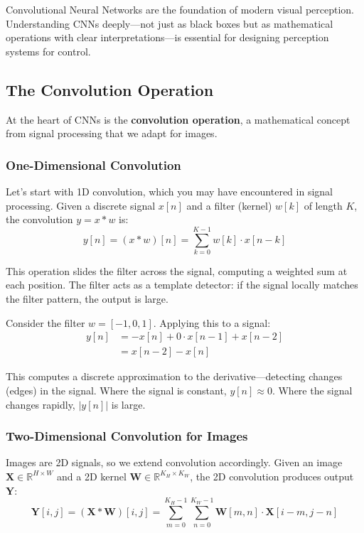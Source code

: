 Convolutional Neural Networks are the foundation of modern visual perception. Understanding CNNs deeply---not just as black boxes but as mathematical operations with clear interpretations---is essential for designing perception systems for control.

\subsection{The Convolution Operation}

At the heart of CNNs is the \textbf{convolution operation}, a mathematical concept from signal processing that we adapt for images.

\subsubsection{One-Dimensional Convolution}

Let's start with 1D convolution, which you may have encountered in signal processing. Given a discrete signal $x[n]$ and a filter (kernel) $w[k]$ of length $K$, the convolution $y = x * w$ is:
\begin{equation}
y[n] = (x * w)[n] = \sum_{k=0}^{K-1} w[k] \cdot x[n - k]
\label{eq:conv1d}
\end{equation}

This operation slides the filter across the signal, computing a weighted sum at each position. The filter acts as a template detector: if the signal locally matches the filter pattern, the output is large.

\begin{example}
Consider the filter $w = [-1, 0, 1]$. Applying this to a signal:
\begin{align}
y[n] &= -x[n] + 0 \cdot x[n-1] + x[n-2] \\
&= x[n-2] - x[n]
\end{align}

This computes a discrete approximation to the derivative---detecting changes (edges) in the signal. Where the signal is constant, $y[n] \approx 0$. Where the signal changes rapidly, $|y[n]|$ is large.
\end{example}

\subsubsection{Two-Dimensional Convolution for Images}

Images are 2D signals, so we extend convolution accordingly. Given an image $\mathbf{X} \in \mathbb{R}^{H \times W}$ and a 2D kernel $\mathbf{W} \in \mathbb{R}^{K_H \times K_W}$, the 2D convolution produces output $\mathbf{Y}$:
\begin{equation}
\mathbf{Y}[i, j] = (\mathbf{X} * \mathbf{W})[i, j] = \sum_{m=0}^{K_H-1} \sum_{n=0}^{K_W-1} \mathbf{W}[m, n] \cdot \mathbf{X}[i - m, j - n]
\label{eq:conv2d}
\end{equation}

